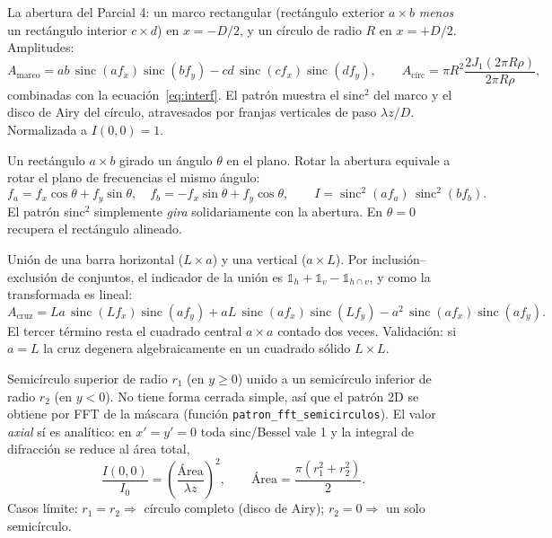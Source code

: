 \documentclass[11pt,a4paper]{article}
\newcommand{\sinc}{\operatorname{sinc}}
\begin{document}
\begin{description}[leftmargin=1.2em,style=nextline]

\item[\textbf{1. Marco + círculo (pto 1).}]
La abertura del Parcial 4: un marco rectangular (rectángulo exterior $a\times b$
\emph{menos} un rectángulo interior $c\times d$) en $x=-D/2$, y un círculo de radio
$R$ en $x=+D/2$. Amplitudes:
\[
A_\text{marco}=ab\,\sinc(a f_x)\sinc(b f_y)-cd\,\sinc(c f_x)\sinc(d f_y),
\qquad
A_\text{círc}=\pi R^2\frac{2J_1(2\pi R\rho)}{2\pi R\rho},
\]
combinadas con la ecuación~\eqref{eq:interf}. El patrón muestra el sinc$^2$ del
marco y el disco de Airy del círculo, atravesados por franjas verticales de paso
$\lambda z/D$. Normalizada a $I(0,0)=1$.

\item[\textbf{2. Rectángulo rotado (pto 3).}]
Un rectángulo $a\times b$ girado un ángulo $\theta$ en el plano. Rotar la abertura
equivale a rotar el plano de frecuencias el mismo ángulo:
\[
f_a=f_x\cos\theta+f_y\sin\theta, \quad f_b=-f_x\sin\theta+f_y\cos\theta,
\qquad I=\sinc^2(a f_a)\,\sinc^2(b f_b).
\]
El patrón sinc$^2$ simplemente \emph{gira} solidariamente con la abertura. En
$\theta=0$ recupera el rectángulo alineado.

\item[\textbf{3. Cruz (pto 5).}]
Unión de una barra horizontal ($L\times a$) y una vertical ($a\times L$). Por
inclusión--exclusión de conjuntos, el indicador de la unión es
$\mathbb{1}_h+\mathbb{1}_v-\mathbb{1}_{h\cap v}$, y como la transformada es lineal:
\[
A_\text{cruz}=La\,\sinc(L f_x)\sinc(a f_y)+aL\,\sinc(a f_x)\sinc(L f_y)
-a^2\,\sinc(a f_x)\sinc(a f_y).
\]
El tercer término resta el cuadrado central $a\times a$ contado dos veces.
Validación: si $a=L$ la cruz degenera algebraicamente en un cuadrado sólido
$L\times L$.

\item[\textbf{4. Dos semicírculos (pto 9).}]
Semicírculo superior de radio $r_1$ (en $y\ge0$) unido a un semicírculo inferior
de radio $r_2$ (en $y<0$). No tiene forma cerrada simple, así que el patrón 2D se
obtiene por FFT de la máscara (función \texttt{patron\_fft\_semicirculos}). El
valor \emph{axial} sí es analítico: en $x'=y'=0$ toda sinc/Bessel vale 1 y la
integral de difracción se reduce al área total,
\[
\frac{I(0,0)}{I_0}=\left(\frac{\text{Área}}{\lambda z}\right)^2,
\qquad \text{Área}=\frac{\pi(r_1^2+r_2^2)}{2}.
\]
Casos límite: $r_1=r_2\Rightarrow$ círculo completo (disco de Airy);
$r_2=0\Rightarrow$ un solo semicírculo.


\end{description}
\end{document}
